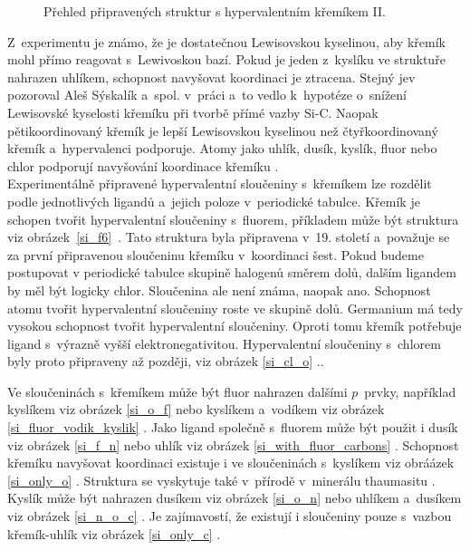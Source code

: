 \documentclass[
digital, %
table,   %
nolof,     %
nolot,     %
oneside,
]{fithesis3}
\renewcommand{\thesubfigure}{}
\begin{document}
\begin{figure}
\begin{center}
\label{shrnuti_struktury_kremikII}
\caption{Přehled připravených struktur s hypervalentním křemíkem II.}
\end{center}
\end{figure}
\renewcommand{\thesubfigure}{}

Z~experimentu je známo, že  je dostatečnou Lewisovskou kyselinou, aby křemík mohl přímo reagovat s~Lewivoskou bazí. Pokud je jeden z~kyslíku ve struktuře nahrazen uhlíkem, schopnost navyšovat koordinaci je ztracena. Stejný jev pozoroval Aleš Sýskalík a~spol. v~práci \cite{Styskalik2015thesis} a~to vedlo k~hypotéze o~snížení Lewisovské kyselosti křemíku při tvorbě přímé vazby Si-C. Naopak pětikoordinovaný křemík je lepší Lewisovskou kyselinou než čtyřkoordinovaný křemík a~hypervalenci podporuje. Atomy jako uhlík, dusík, kyslík, fluor nebo chlor podporují navyšování koordinace křemíku \cite{Wagler2014}.\\

Experimentálně připravené hypervalentní sloučeniny s~křemíkem lze rozdělit podle jednotlivých ligandů a~jejich poloze v~periodické tabulce. Křemík je schopen tvořit hypervalentní sloučeniny s~fluorem, příkladem může být struktura   viz obrázek~\ref{si_f6}~\cite{memoriesphysiquelussac}. Tato struktura byla připravena v~19. století a~považuje se za první připravenou sloučeninu křemíku v~koordinaci šest. Pokud budeme postupovat v periodické tabulce skupině halogenů směrem dolů, dalším ligandem by měl být logicky chlor. Sloučenina  ale není známa, naopak  ano. Schopnost atomu tvořit hypervalentní sloučeniny roste ve skupině dolů. Germanium má tedy vysokou schopnost tvořit hypervalentní sloučeniny. Oproti tomu křemík potřebuje ligand s~výrazně vyšší elektronegativitou. Hypervalentní sloučeniny s~chlorem byly proto připraveny až později, viz obrázek \ref{si_cl_o} \cite{LAZAREV199716}..

Ve sloučeninách s~křemíkem může být fluor nahrazen dalšími $p$~prvky, například kyslíkem viz obrázek \ref{si_o_f} \cite{C0DT01115K} nebo kyslíkem a~vodíkem viz obrázek \ref{si_fluor_vodik_kyslik} \cite{BOYER19812165}.
Jako ligand společně s~fluorem může být použit i dusík viz obrázek \ref{si_f_n} \cite{C0DT01115K} nebo uhlík viz obrázek \ref{si_with_fluor_carbons} \cite{kremikfluorcarbon}. Schopnost křemíku navyšovat koordinaci existuje i ve sloučeninách s~kyslíkem viz obráázek \ref{si_only_o} \cite{flyn1969}.  Struktura  se vyskytuje také v~přírodě v~minerálu thaumasitu \cite{Edge:a08100}. Kyslík může být nahrazen dusíkem  viz obrázek \ref{si_o_n} \cite{Wagler2014} nebo uhlíkem a~dusíkem viz obrázek \ref{si_n_o_c} \cite{Wagler2014}. Je zajímavostí, že existují i sloučeniny pouze s~vazbou křemík-uhlík viz obrázek \ref{si_only_c} \cite{A901953G} \cite{Wagler2014}.
\end{document}
